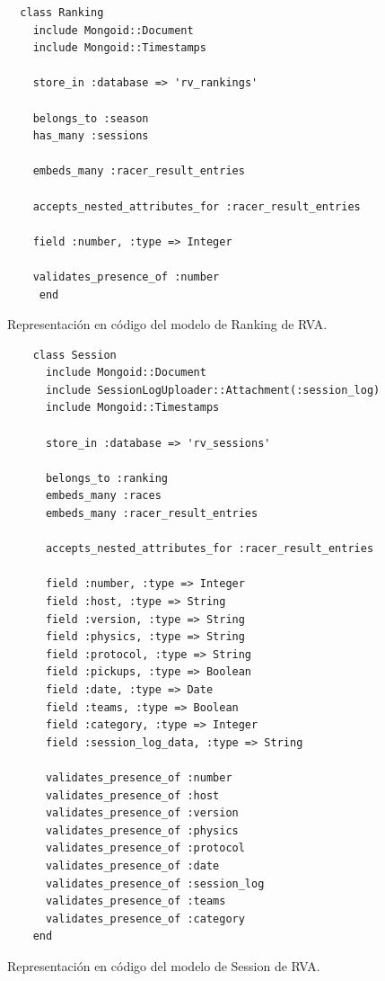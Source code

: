 \begin{listing}
\begin{verbatim}
  class Ranking
    include Mongoid::Document
    include Mongoid::Timestamps
    
    store_in :database => 'rv_rankings'
    
    belongs_to :season
    has_many :sessions
    
    embeds_many :racer_result_entries
    
    accepts_nested_attributes_for :racer_result_entries
    
    field :number, :type => Integer
    
    validates_presence_of :number
	 end
\end{verbatim}
\caption[Esquema de Ranking]{Representación en código del modelo de Ranking de RVA.}
\end{listing}

\begin{listing}
  \begin{verbatim}
    class Session
      include Mongoid::Document
      include SessionLogUploader::Attachment(:session_log)
      include Mongoid::Timestamps
      
      store_in :database => 'rv_sessions'
      
      belongs_to :ranking
      embeds_many :races
      embeds_many :racer_result_entries
      
      accepts_nested_attributes_for :racer_result_entries
      
      field :number, :type => Integer
      field :host, :type => String
      field :version, :type => String
      field :physics, :type => String
      field :protocol, :type => String
      field :pickups, :type => Boolean
      field :date, :type => Date
      field :teams, :type => Boolean
      field :category, :type => Integer
      field :session_log_data, :type => String
      
      validates_presence_of :number
      validates_presence_of :host
      validates_presence_of :version
      validates_presence_of :physics
      validates_presence_of :protocol
      validates_presence_of :date
      validates_presence_of :session_log
      validates_presence_of :teams
      validates_presence_of :category
    end
  \end{verbatim}
  \caption[Esquema de Session]{Representación en código del modelo de Session de RVA.}
\end{listing}

